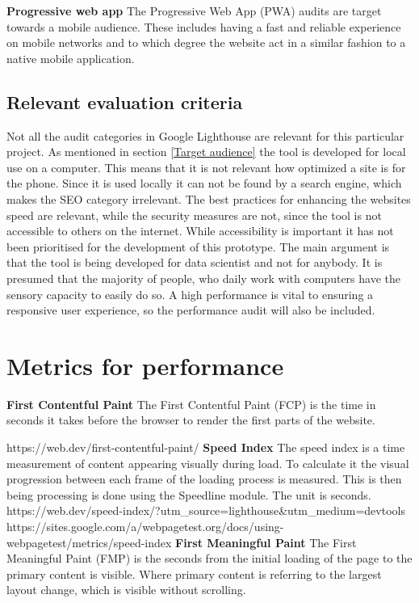 \textbf{Progressive web app}
The Progressive Web App (PWA) audits are target towards a mobile audience. These includes having a fast and reliable experience on mobile networks and to which degree the website act in a similar fashion to a native mobile application.
\citep{LhPWA}

\subsection{Relevant evaluation criteria}
 
Not all the audit categories in Google Lighthouse are relevant for this particular project. As mentioned in section \ref{Target audience}  the tool is developed for local use on a computer. This means that it is not relevant how optimized a site is for the phone. Since it is used locally it can not be found by a search engine, which makes the SEO category irrelevant. The best practices for enhancing the websites speed are relevant, while the security measures are not, since the tool is not accessible to others on the internet. While accessibility is important it has not been prioritised for the development of this prototype. The main argument is that the tool is being developed for data scientist and not for anybody. It is presumed that the majority of people, who daily work with computers have the sensory capacity to easily do so. A high performance is vital to ensuring a responsive user experience, so the performance audit will also be included.



\section{Metrics for performance}





\textbf{First Contentful Paint}
The First Contentful Paint (FCP) is the time in seconds it takes before the browser to render the first parts of the website. 

https://web.dev/first-contentful-paint/
\textbf{Speed Index}
The speed index is a time measurement of content appearing visually during load. To calculate it the visual progression between each frame of the loading process is measured. This is then being processing is done using the Speedline module. The unit is seconds.
https://web.dev/speed-index/?utm_source=lighthouse&utm_medium=devtools
https://sites.google.com/a/webpagetest.org/docs/using-webpagetest/metrics/speed-index
\textbf{First Meaningful Paint}
The First Meaningful Paint (FMP) is the seconds from the initial loading of the page to the primary content is visible. Where primary content is referring to the largest layout change, which is visible without scrolling.

